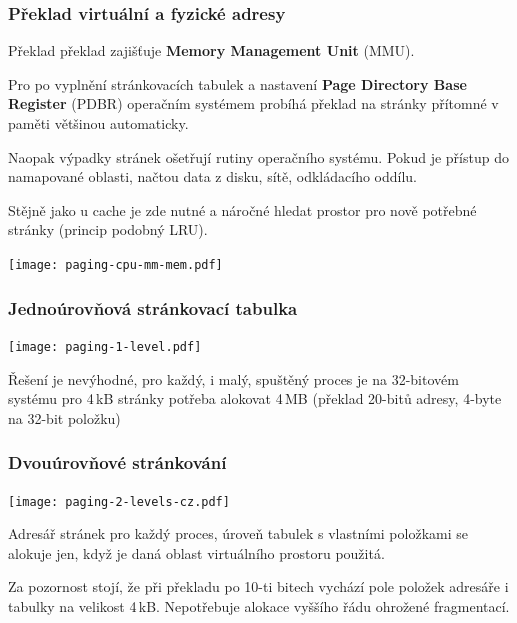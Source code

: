 \documentclass{beamer}
\begin{document}
\begin{frame}
\frametitle{Překlad virtuální a fyzické adresy}

Překlad překlad zajišťuje \textbf{Memory Management Unit} (MMU).

Pro po vyplnění stránkovacích tabulek a nastavení \textbf{Page Directory Base Register}
(PDBR) operačním systémem probíhá překlad na stránky přítomné v paměti většinou automaticky.

Naopak výpadky stránek ošetřují rutiny operačního systému. Pokud je přístup do namapované
oblasti, načtou data z disku, sítě, odkládacího oddílu.

Stějně jako u cache je zde nutné a náročné hledat prostor pro nově potřebné stránky (princip podobný LRU).

\vskip 2mm

{
\centering

\texttt{[image: paging-cpu-mm-mem.pdf]}

}
\end{frame}

\begin{frame}
\frametitle{Jednoúrovňová stránkovací tabulka}

{
\centering

\texttt{[image: paging-1-level.pdf]}

}

Řešení je nevýhodné, pro každý, i malý, spuštěný proces je na 32-bitovém
systému pro 4\,kB stránky potřeba alokovat 4\,MB (překlad 20-bitů adresy,
4-byte na 32-bit položku) 

\end{frame}


\begin{frame}
\frametitle{Dvouúrovňové stránkování}

{
\centering

\texttt{[image: paging-2-levels-cz.pdf]}

}

Adresář stránek pro každý proces, úroveň tabulek s vlastními položkami
se alokuje jen, když je daná oblast virtuálního prostoru použitá.

Za pozornost stojí, že při překladu po 10-ti bitech vychází pole položek
adresáře i tabulky na velikost 4\,kB. Nepotřebuje alokace vyššího řádu
ohrožené fragmentací.

\end{frame}
\end{document}
